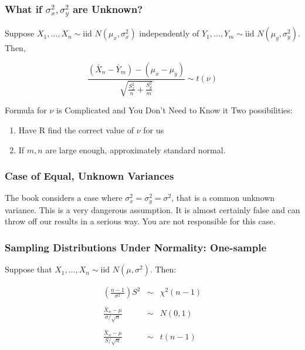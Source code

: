 \documentclass{beamer}
\begin{document}
\begin{frame}
\frametitle{What if $\sigma_x^2,\sigma_y^2$ are Unknown?}
Suppose $X_1, \hdots, X_{n} \sim \mbox{iid } N(\mu_x, \sigma^2_x)$ independently of $Y_1, \hdots, Y_{m} \sim \mbox{iid } N(\mu_y, \sigma^2_y)$. Then,

\vspace{1em}
$$\frac{\left(\bar{X}_n - \bar{Y}_m\right) - (\mu_x - \mu_y)}{\sqrt{\displaystyle\frac{S_x^2}{n} + \frac{S_y^2}{m} }}\sim t(\nu)$$
\vspace{1em}

\begin{block}{Formula for $\nu$ is Complicated and You Don't Need to Know it}
Two possibilities:
	\begin{enumerate}
		\item Have R find the correct value of $\nu$ for us
		\item If $m,n$ are large enough, approximately standard normal. 
	\end{enumerate}
\end{block}

\end{frame}

\begin{frame}
\frametitle{Case of Equal, Unknown Variances}

The book considers a case where $\sigma^2_x = \sigma^2_y = \sigma^2$, that is a common unknown variance. This is a \alert{very dangerous assumption}. It is almost certainly false and can throw off our results in a serious way. You are not responsible for this case.
\end{frame}

\begin{frame}
\frametitle{Sampling Distributions Under Normality: One-sample}
Suppose that $X_1, \hdots, X_n \sim \mbox{iid } N(\mu,\sigma^2)$. Then:

	\begin{eqnarray*}
		\left(\frac{n-1}{\sigma^2}\right) S^2&\sim&\chi^2(n-1)\\ \\
		\frac{\bar{X}_n-\mu}{\sigma/\sqrt{n}}&\sim& N(0,1)\\ \\
		\frac{\bar{X}_n-\mu}{S/\sqrt{n}}&\sim&t(n-1)
	\end{eqnarray*}
\end{frame}
\end{document}
